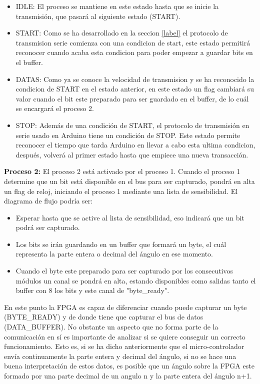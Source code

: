 \begin{itemize}
	\item IDLE: El proceso se mantiene en este estado hasta que se inicie la transmisión, que pasará al siguiente estado (START).
	\item START: Como se ha desarrollado en la seccion \ref{label} el protocolo de transmision serie comienza con una condicion de start, este estado permitirá reconocer cuando acaba esta condicion para poder empezar a guardar bits en el buffer. 
	\item DATAS: Como ya se conoce la velocidad de transmision y se ha reconocido la condicion de START en el estado anterior, en este estado un flag cambiará su valor cuando el bit este preparado para ser guardado en el buffer, de lo cuál se encargará el proceso 2.
	\item STOP: Además de una condición de START, el protocolo de transmisión en serie usado en Arduino tiene un condición de STOP. Este estado permite reconocer el tiempo que tarda Arduino en llevar a cabo esta ultima condicion, después, volverá al primer estado hasta que empiece una nueva transacción.
\end{itemize}

\textbf{Proceso 2:} El proceso 2 está activado por el proceso 1. Cuando el proceso 1 determine que un bit está disponible en el bus para ser capturado, pondrá en alta un flag de reloj, iniciando el proceso 1 mediante una lista de sensibilidad. El diagrama de flujo podría ser:

\begin{itemize}
	\item Esperar hasta que se active al lista de sensibilidad, eso indicará que un bit podrá ser capturado.
	\item Los bits se irán guardando en un buffer que formará un byte, el cuál representa la parte entera o decimal del ángulo en ese momento.
	\item Cuando el byte este preparado para ser capturado por los consecutivos módulos un canal se pondrá en alta, estando disponibles como salidas tanto el buffer con 8 los bits y este canal de "byte\_ready".
\end{itemize}

En este punto la FPGA es capaz de diferenciar cuando puede capturar un byte (BYTE\_READY) y de donde tiene que capturar el bus de datos (DATA\_BUFFER). No obstante un aspecto que no forma parte de la comunicación en sí es importante de analizar si se quiere conseguir un correcto funcionamiento. Esto es, si se ha dicho anteriormente que el micro-controlador envía continuamente la parte entera y decimal del ángulo, si no se hace una buena interpretación de estos datos, es posible que un ángulo sobre la FPGA este formado por una parte decimal de un angulo n y la parte entera del ángulo n+1. \newline

